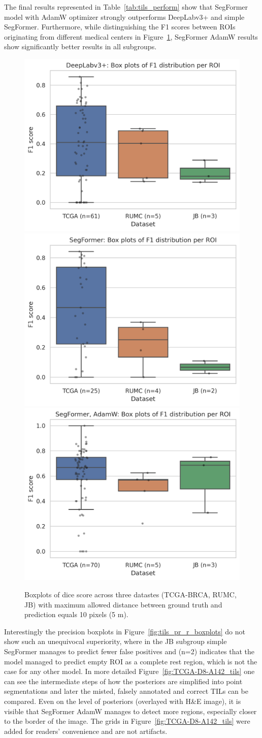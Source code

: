 The final results represented in Table~\ref*{tab:tils_perform} show that SegFormer
model with AdamW optimizer strongly outperforms DeepLabv3+ and simple SegFormer.
Furthermore, while distinguishing the F1 scores between ROIs originating from different medical
centers in Figure~\ref*{fig:tils_dice_boxplots}, SegFormer AdamW results show
significantly better results in all subgroups.
\begin{figure}[H]
    \includegraphics[width=.32\linewidth]{figures/tils/deeplabv3+_F1_roi_adj.png}
    \includegraphics[width=.32\linewidth]{figures/tils/segformer_F1_roi_adj.png}
    \includegraphics[width=.32\linewidth]{figures/tils/segformer,_adamw_F1_roi_adj.png}
    \caption{Boxplots of dice score across three datastes (TCGA-BRCA, RUMC, JB) with
    maximum allowed distance between ground truth and prediction equals 10 pixels (5 \textmu m).}
    \label{fig:tils_dice_boxplots}
\end{figure}
Interestingly the precision boxplots
in Figure~\ref*{fig:tils_pr_r_boxplots} do not show such an unequivocal superiority,
where in the JB subgroup simple SegFormer manages to predict fewer false positives and 
(n=2) indicates that the model managed to predict empty ROI as a complete rest region,
which is not the case for any other model.
In more detailed
Figure~\ref*{fig:TCGA-D8-A142_tils} one can see the intermediate steps of
how the posteriors are simplified into point segmentations and later the misted,
falsely annotated and correct TILs can be compared. Even on the level of posteriors
(overlayed with H\&E image), it is visible that SegFormer AdamW manages to detect
more regions, especially closer to the border of the image. The grids in Figure~\ref*{fig:TCGA-D8-A142_tils}
were added for readers' convenience and are not artifacts. 

